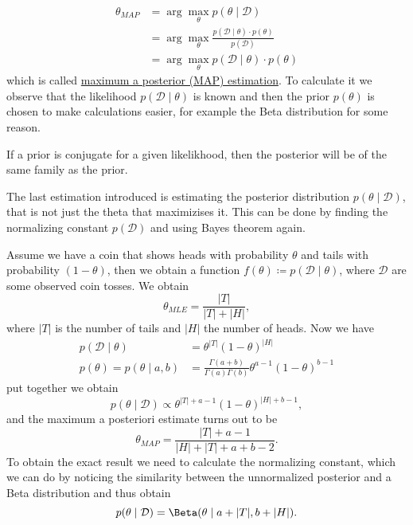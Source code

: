 \documentclass[12 pt]{article}        	%
\begin{document}
\begin{align*}
    \theta_{ MAP } 
    &= \arg \max_{ \theta } p ( \theta \mid \mathcal{ D } )
    \\
    &=
    \arg \max_{ \theta } \frac{ p ( \mathcal{ D } \mid \theta ) \cdot p ( \theta ) }{ p ( \mathcal{ D } ) }
    \\
    &=
    \arg \max_{ \theta } p ( \mathcal{ D } \mid \theta ) \cdot p ( \theta ) 
\end{align*}
which is called \underline{maximum a posterior (MAP) estimation}.
To calculate it we observe that the likelihood $ p ( \mathcal{ D } \mid \theta ) $ is known and then the prior $ p ( \theta ) $ is
chosen to make calculations easier, for example the Beta distribution for some reason.

If a prior is conjugate for a given likelikhood, then the posterior will be of the same family as the prior.


The last estimation introduced is estimating the posterior distribution $ p ( \theta \mid \mathcal{ D } ) $, that is not just the theta that maximizises it.
This can be done by finding the normalizing constant $ p ( \mathcal{ D } ) $ and using Bayes theorem again.

\begin{exmp}
    Assume we have a coin that shows heads with probability $ \theta $ and tails with probability $ ( 1 - \theta ) $, then we obtain a function $ f ( \theta ) \coloneqq p ( \mathcal{ D } \mid \theta ) $, where $ \mathcal{ D } $ are some observed coin tosses.
    We obtain 
    \[
        \theta_{ MLE } 
        =
        \frac{ \lvert T \rvert }{ \lvert T \rvert + \lvert H \rvert },
    \]
    where    $ \lvert T \rvert $ is the number of tails and $ \lvert H \rvert $ the number of heads.
    Now we have
    \begin{align*}
        p ( \mathcal{ D } \mid \theta )
        &=
        \theta^{ \lvert T \rvert } ( 1 - \theta )^{ \lvert H \rvert }
        \\
        p ( \theta )
        =
        p ( \theta \mid a , b )
        &=
        \frac{ \Gamma ( a  + b ) }{ \Gamma ( a ) \Gamma ( b ) } \theta^{ a- 1 } ( 1 - \theta )^{ b - 1 }
    \end{align*}
    put together we obtain
    \[
        p( \theta \mid \mathcal{ D } ) 
        \propto
        \theta^{ \lvert T \rvert + a - 1 } ( 1 - \theta )^{ \lvert H \rvert + b - 1 },
    \]
    and the maximum a posteriori estimate turns out to be
    \[
        \theta_{ MAP } 
        =
        \frac{ \lvert T \rvert + a - 1 }{ \lvert H \rvert + \lvert T \rvert + a + b - 2 }.
    \]
    To obtain the exact result we need to calculate the normalizing constant, which we can do by noticing the similarity between the unnormalized posterior and a Beta distribution and thus obtain
    \[
        p ( \theta \mid \mathcal{ D } )
        =
        \Beta ( \theta \mid a + \lvert T \rvert, b + \lvert H \rvert ).
    \]
\end{exmp}
\end{document}
